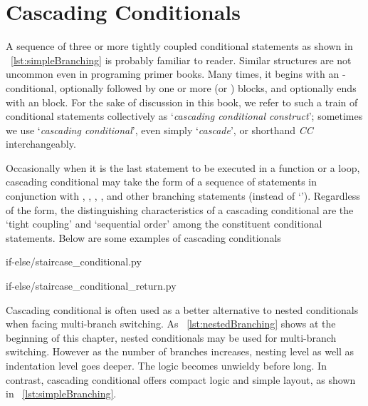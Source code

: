 
\chapter{Cascading Conditionals}\label{ch:conditional-cascade}

A sequence of three or more tightly coupled conditional statements as shown in
~\autoref{lst:simpleBranching} is probably familiar to reader.
Similar structures are not uncommon even in programing primer books.
Many times, it begins with an -conditional, optionally followed by one or more
 (or ) blocks, and optionally ends with an  block.
For the sake of discussion in this book, we refer to such a train of conditional statements
collectively as `\emph{cascading conditional construct}';
sometimes we use `\emph{cascading conditional}', even simply `\emph{cascade}',
or shorthand \emph{CC}  interchangeably.

Occasionally when it is the last statement to be executed in a function
or a loop, cascading conditional may take the form of a sequence of  statements
in conjunction with , ,
, ,  and other branching statements (instead
of `').
Regardless of the form, the distinguishing characteristics of a cascading conditional are
the `tight coupling' and `sequential order' among the constituent conditional statements.
Below are some examples of cascading conditionals
\begin{clisting}[h]
    \begin{minipage}[t]{.4\textwidth}
        
        {if-else/staircase_conditional.py}
    \end{minipage}\hfill
    \begin{minipage}[t]{.4\textwidth}
        
        {if-else/staircase_conditional_return.py}
    \end{minipage}
\end{clisting}



Cascading conditional is often used as a better alternative to nested conditionals
when facing multi-branch switching.
As ~\autoref{lst:nestedBranching} shows at the beginning of this chapter,
nested conditionals may be used for multi-branch switching.
However as the number of branches increases, nesting level as well as indentation level goes deeper.
The logic becomes unwieldy before long.
In contrast, cascading conditional offers compact logic and simple layout,
as shown in ~\autoref{lst:simpleBranching}.


